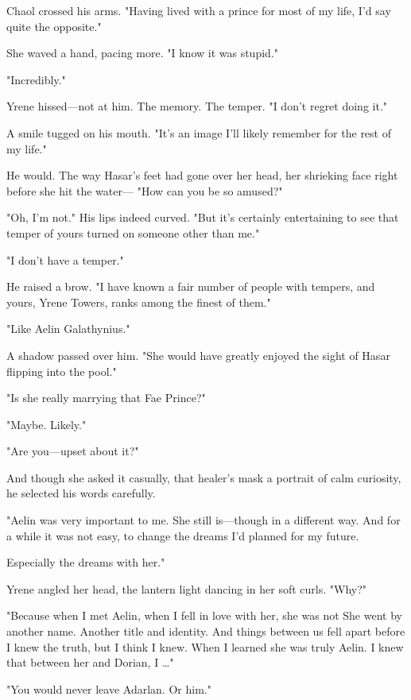 Chaol crossed his arms. "Having lived with a prince for most of my life, I'd say quite the opposite."

She waved a hand, pacing more. "I know it was stupid."

"Incredibly."

Yrene hissed---not at him. The memory. The temper. "I don't regret doing it."

A smile tugged on his mouth. "It's an image I'll likely remember for the rest of my life."

He would. The way Hasar's feet had gone over her head, her shrieking face right before she hit the water--- "How can you be so amused?"

"Oh, I'm not." His lips indeed curved. "But it's certainly entertaining to see that temper of yours turned on someone other than me."

"I don't have a temper."

He raised a brow. "I have known a fair number of people with tempers, and yours, Yrene Towers, ranks among the finest of them."

"Like Aelin Galathynius."

A shadow passed over him. "She would have greatly enjoyed the sight of Hasar flipping into the pool."

"Is she really marrying that Fae Prince?"

"Maybe. Likely."

"Are you---upset about it?"

And though she asked it casually, that healer's mask a portrait of calm curiosity, he selected his words carefully.

"Aelin was very important to me. She still is---though in a different way. And for a while  it was not easy, to change the dreams I'd planned for my future.

Especially the dreams with her."

Yrene angled her head, the lantern light dancing in her soft curls. "Why?"

"Because when I met Aelin, when I fell in love with her, she was not
 She went by another name. Another title and identity. And things between us fell apart before I knew the truth, but  I think I knew. When I learned she was truly Aelin. I knew that between her and Dorian, I \ldots"

"You would never leave Adarlan. Or him."

